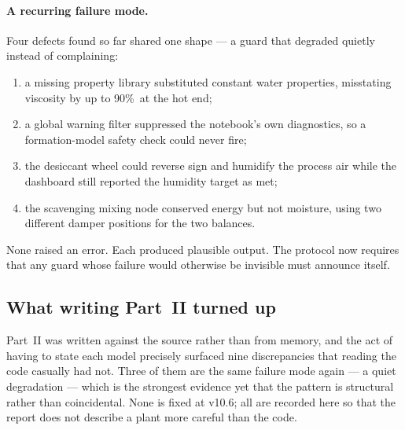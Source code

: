 \documentclass[11pt]{article}
\begin{document}
\paragraph{A recurring failure mode.} Four defects found so far shared one
shape --- a guard that degraded quietly instead of complaining:

\begin{enumerate}[nosep]
  \item a missing property library substituted constant water properties,
        misstating viscosity by up to 90\%\ at the hot end;
  \item a global warning filter suppressed the notebook's own diagnostics,
        so a formation-model safety check could never fire;
  \item the desiccant wheel could reverse sign and humidify the process air
        while the dashboard still reported the humidity target as met;
  \item the scavenging mixing node conserved energy but not moisture, using
        two different damper positions for the two balances.
\end{enumerate}

None raised an error. Each produced plausible output. The protocol now
requires that any guard whose failure would otherwise be invisible must
announce itself.

\subsection{What writing Part~II turned up}

Part~II was written against the source rather than from memory, and the act of
having to state each model precisely surfaced nine discrepancies that reading
the code casually had not. Three of them are the same failure mode again --- a
quiet degradation --- which is the strongest evidence yet that the pattern is
structural rather than coincidental. None is fixed at v10.6; all are recorded
here so that the report does not describe a plant more careful than the code.
\end{document}
